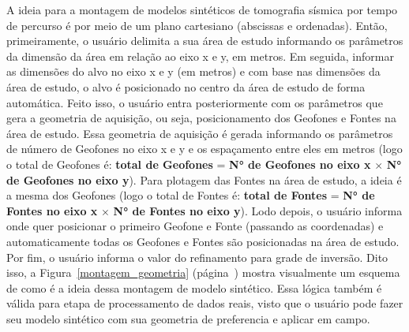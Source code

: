 \documentclass[a4paper, 12 pt]{article} %
\begin{document}
A ideia para a montagem de modelos sintéticos de tomografia sísmica por tempo de percurso é por meio de um plano cartesiano (abscissas e ordenadas). Então, primeiramente, o usuário delimita a sua área de estudo informando os parâmetros da dimensão da área em relação ao eixo x e y, em metros. Em seguida, informar as dimensões do alvo no eixo x e y (em metros) e com base nas dimensões da área de estudo, o alvo é posicionado no centro da área de estudo de forma automática. Feito isso, o usuário entra posteriormente com os parâmetros que gera a geometria de aquisição, ou seja, posicionamento dos Geofones e Fontes na área de estudo. Essa geometria de aquisição é gerada informando os parâmetros de número de Geofones no eixo x e y e os espaçamento entre eles em metros (logo o total de Geofones é: \textbf{total de Geofones} = \textbf{N° de Geofones no eixo x} $\times$ \textbf{N° de Geofones no eixo y}). Para plotagem das Fontes na área de estudo, a ideia é a mesma dos Geofones (logo o total de Fontes é: \textbf{total de Fontes} = \textbf{N° de Fontes no eixo x} $\times$ \textbf{N° de Fontes no eixo y}). Lodo depois, o usuário informa onde quer posicionar o primeiro Geofone e Fonte (passando as coordenadas) e automaticamente todas os Geofones e Fontes são posicionadas na área de estudo. Por fim, o usuário informa o valor do refinamento para grade de inversão. Dito isso, a Figura~\ref{montagem_geometria} (página~\pageref{montagem_geometria}) mostra visualmente um esquema de como é a ideia dessa montagem de modelo sintético. Essa lógica também é válida para etapa de processamento de dados reais, visto que o usuário pode fazer seu modelo sintético com sua geometria de preferencia e aplicar em campo.
\end{document}
